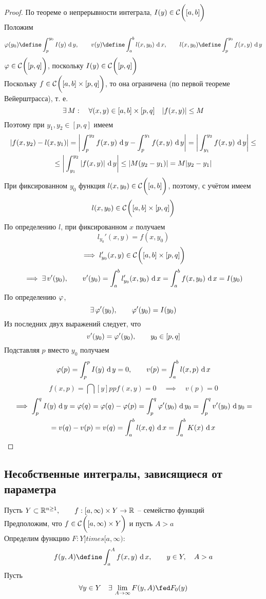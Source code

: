 \begin{proof}
	По теореме о непрерывности интеграла, $ I(y) \in \Cont{[a, b]} $ \\
	Положим
	$$ \vphi(y_0) \define \dint[y]{p}{y_0}{I(y)}, \qquad v(y) \define \dint{a}b{l(x, y_0)}, \qquad l(x, y_0) \define \dint[y]{p}{y_0}{f(x, y)} $$
	$ \vphi \in \Cont{[p, q]} $, поскольку $ I(y) \in \Cont{[p, q]} $ \\
	Поскольку $ f \in \Cont{[a, b] \times [p, q]} $, то она ограничена (по первой теореме Вейерштрасса), т. е.
	$$ \exist M : \quad \forall (x, y) \in [a, b] \times [p, q] \quad |f(x, y)| \le M $$
	Поэтому при $ y_1, y_2 \in [p, q] $ имеем
	\begin{multline}\lbl{24}
		|f(x, y_2) - l(x, y_1)| = \bigg| \dint[y]{p}{y_2}{f(x, y)} - \dint[y]{p}{y_1}{f(x, y)} \bigg| = \bigg| \dint[y]{y_1}{y_2}{f(x, y)} \bigg| \le \\
		\le \bigg| \dint[y]{y_1}{y_2}{|f(x, y)|} \bigg| \le |M(y_2 - y_1)| = M|y_2 - y_1|
	\end{multline}
	При фиксированном $ y_0 $ функция $ l(x, y_0) \in \Cont{[a, b]} $, поэтому, с учётом  имеем
	$$ l(x, y_0) \in \Cont{[a, b] \times [p, q]} $$
	По определению $ l $, при фиксированном $ x $ получаем
	$$ l_{y_0}'(x, y) = f(x, y_0) $$
	$$ \implies l_{y_0}'(x, y) \in \Cont{[a, b] \times [p, q]} $$
	$$ \implies \exist v'(y_0), \qquad v'(y_0) = \dint{a}b{l_{y_0}'(x, y_0)} = \dint{a}b{f(x, y_0)} = I(y_0) $$
	По определению $ \vphi $,
	$$ \exist \vphi'(y_0), \qquad \vphi'(y_0) = I(y_0) $$
	Из последних двух выражений следует, что
	$$ v'(y_0) = \vphi'(y_0), \qquad y_0 \in [p, q] $$
	Подставляя $ p $ вместо $ y_0 $ получаем
	$$ \vphi(p) = \dint[y]{p}p{I(y)} = 0, \qquad v(p) = \dint{a}b{l(x, p)} $$
	$$ f(x, p) = \dint[y]{p}p{f(x, y)} = 0 \quad \implies \quad v(p) = 0 $$
	\begin{multline*}
		\implies \dint[y]pq{I(y)} = \vphi(q) = \vphi(q) - \vphi(p) = \dint[y_0]pq{\vphi'(y_0)} = \dint[y_0]{p}q{v'(y_0)} = \\
		= v(q) - v(p) = v(q) = \dint{a}b{l(x, q)} = \dint{a}b{K(x)}
	\end{multline*}
\end{proof}

\subsection{Несобственные интегралы, зависящиеся от параметра}

Пусть $ Y \sub \R^{n \ge 1}, \qquad f : [a, \infty) \times Y \to \R $ -- семейство функций \\
Предположим, что $ f \in \Cont{[a, \infty) \times Y} $ и пусть $ A > a $ \\
Определим функцию $ F : Y ]times [a, \infty) $:
$$ f(y, A) \define \dint{a}A{f(x, y)}, \qquad y \in Y, \quad A > a $$
Пусть
$$ \forall y \in Y \quad \exist \limi{A} F(y, A) \fed F_0(y) $$

